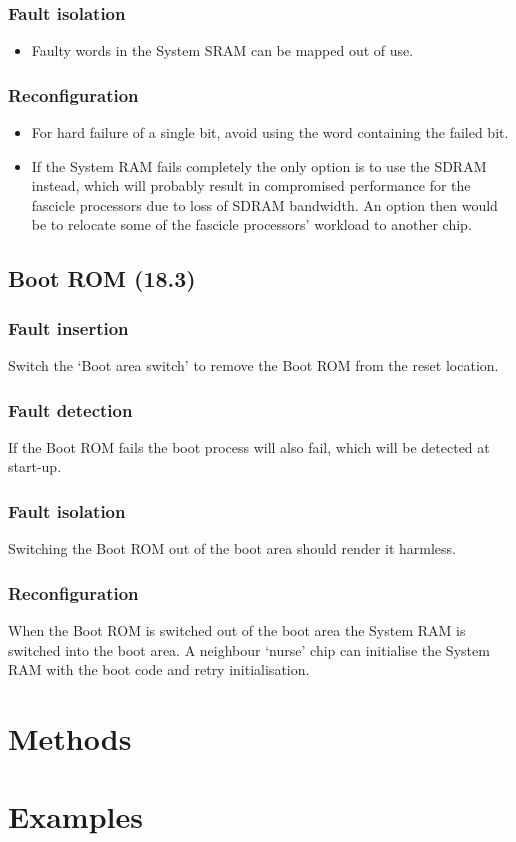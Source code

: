 \documentclass[12pt]{article}
\newenvironment{itmz}{
	\begin{itemize}
		\setlength{\itemsep}{0pt}
		\setlength{\parskip}{0pt}
	}{\end{itemize}}
\begin{document}
\subsubsection*{Fault isolation}
\begin{itmz}
\item Faulty words in the System SRAM can be mapped out of use.
\end{itmz}
\subsubsection*{Reconfiguration}
\begin{itmz}
\item For hard failure of a single bit, avoid using the word containing the failed bit.
\item If the System RAM fails completely the only option is to use the SDRAM instead, which will
probably result in compromised performance for the fascicle processors due to loss of SDRAM
bandwidth. An option then would be to relocate some of the fascicle processors' workload to
another chip.
\end{itmz}

\subsection{Boot ROM (18.3)}
\subsubsection*{Fault insertion}
Switch the `Boot area switch' to remove the Boot ROM from the reset location.
\subsubsection*{Fault detection}
If the Boot ROM fails the boot process will also fail, which will be detected at start-up.
\subsubsection*{Fault isolation}
Switching the Boot ROM out of the boot area should render it harmless.
\subsubsection*{Reconfiguration}
When the Boot ROM is switched out of the boot area the System RAM is switched into the boot
area. A neighbour `nurse' chip can initialise the System RAM with the boot code and retry
initialisation.

\section{Methods}

\section{Examples}
\end{document}
